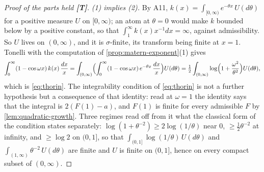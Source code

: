 \begin{proof}[Proof of the parts held \textbf{[T]}]
\leanok
\emph{(1) implies (2).} By A11, $k(x) = \int_{[0,\infty)} e^{-\theta x}\,U(d\theta)$ for a
positive measure $U$ on $[0,\infty)$; an atom at $\theta = 0$ would make $k$ bounded below by a
positive constant, so that $\int_1^\infty k(x)x^{-1}dx = \infty$, against admissibility. So $U$
lives on $(0,\infty)$, and it is $\sigma$-finite, its transform being finite at $x = 1$.
Tonelli with the computation of \ref{prop:matern-exponent}(1) gives
\[
  \int_0^\infty (1-\cos\omega x)\,k(x)\,\frac{dx}{x}
  = \int_{(0,\infty)}\Bigl(\int_0^\infty (1-\cos\omega x)\,e^{-\theta x}\,\frac{dx}{x}\Bigr) U(d\theta)
  = \tfrac12\int_{(0,\infty)}\log\Bigl(1 + \frac{\omega^2}{\theta^2}\Bigr)U(d\theta),
\]
which is \ref{eq:thorin}. The integrability condition of \ref{eq:thorin} is not a further
hypothesis but a consequence of that identity: read at $\omega = 1$ the identity says that the
integral is $2(F(1) - a)$, and $F(1)$ is finite for every admissible $F$ by
\ref{lem:quadratic-growth}. Three regimes read off from it what the classical form of the
condition states separately: $\log(1+\theta^{-2}) \ge 2\log(1/\theta)$ near $0$,
$\ge \tfrac12\theta^{-2}$ at infinity, and $\ge \log 2$ on $(0,1]$, so that
$\int_{(0,1]}\log(1/\theta)\,U(d\theta)$ and $\int_{(1,\infty)}\theta^{-2}\,U(d\theta)$ are
finite and $U$ is finite on $(0,1]$, hence on every compact subset of $(0,\infty)$.


\end{proof}
